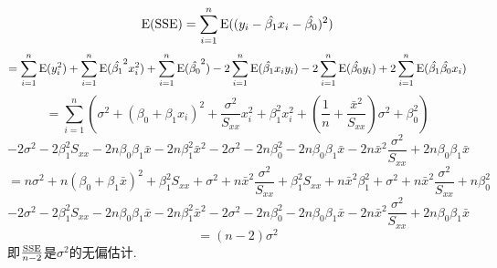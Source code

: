 \documentclass{article}
\begin{document}
\begin{CJK}{UTF8}{gbsn}
\subsection{}
$$ {\rm E}({\rm SSE})=\sum\limits_{i=1}^{n}{\rm E}((y_{i}-\hat{\beta_{1}}x_{i}-\hat{\beta_{0}})^{2})$$
$$ =\sum\limits_{i=1}^{n}{\rm E}(y_{i}^{2})+\sum\limits_{i=1}^{n}{\rm E}(\hat{\beta_{1}}^{2}x_{i}^{2})+\sum\limits_{i=1}^{n}{\rm E}(\hat{\beta_{0}}^{2})-2\sum\limits_{i=1}^{n}{\rm E}(\hat{\beta_{1}}x_{i}y_{i})-2\sum\limits_{i=1}^{n}{\rm E}(\hat{\beta_{0}}y_{i})+2\sum\limits_{i=1}^{n}{\rm E}(\hat{\beta_{1}}\hat{\beta_{0}}x_{i}) $$
$$ =\sum\limits_{i=1}^{n}(\sigma^{2}+(\beta_{0}+\beta_{1}x_{i})^{2} + \frac{\sigma^{2}}{S_{xx}}x_{i}^{2}+\beta_{1}^{2}x_{i}^{2} + (\frac{1}{n}+\frac{\bar{x}^{2}}{S_{xx}})\sigma^{2}+\beta_{0}^{2}) $$
$$ -2\sigma^{2}-2\beta_{1}^{2}S_{xx}-2n\beta_{0}\beta_{1}\bar{x}-2n\beta_{1}^{2}\bar{x}^{2} - 2\sigma^{2}-2n\beta_{0}^{2}-2n\beta_{0}\beta_{1}\bar{x}-2n\bar{x}^{2}\frac{\sigma^{2}}{S_{xx}}+2n\beta_{0}\beta_{1}\bar{x} $$
$$ =n\sigma^{2}+n(\beta_{0}+\beta_{1}\bar{x})^{2}+\beta_{1}^{2}S_{xx}+\sigma^{2}+n\bar{x}^{2}\frac{\sigma^{2}}{S_{xx}}+\beta_{1}^{2}S_{xx}+n\bar{x}^{2}\beta_{1}^{2}+\sigma^{2}+n\bar{x}^{2}\frac{\sigma^{2}}{S_{xx}}+n\beta_{0}^{2} $$
$$ -2\sigma^{2}-2\beta_{1}^{2}S_{xx}-2n\beta_{0}\beta_{1}\bar{x}-2n\beta_{1}^{2}\bar{x}^{2} - 2\sigma^{2}-2n\beta_{0}^{2}-2n\beta_{0}\beta_{1}\bar{x}-2n\bar{x}^{2}\frac{\sigma^{2}}{S_{xx}}+2n\beta_{0}\beta_{1}\bar{x} $$
$$ =(n-2)\sigma^{2} $$
即$\frac{\rm SSE}{n-2}$是$\sigma^{2}$的无偏估计.
\end{CJK}
\end{document}

